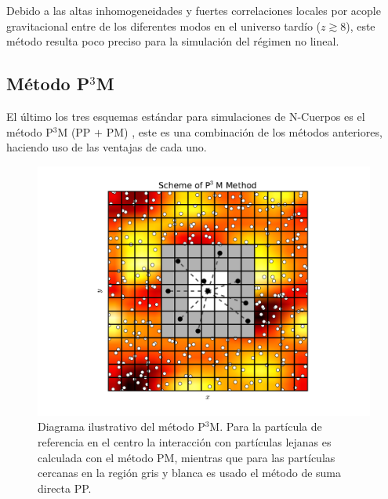 Debido a las altas inhomogeneidades y fuertes correlaciones locales por 
acople gravitacional entre de los diferentes modos en el universo tardío 
($z\gtrsim 8$), este método resulta poco preciso para la simulación del 
régimen no lineal. 


	\subsection{Método P$^3$M}
	\label{subsec:P3Method}
	
	
El último los tres esquemas estándar para simulaciones de N-Cuerpos es el 
método P$^3$M (PP $+$ PM) \cite{hockney1988}, este es una combinación de 
los métodos anteriores, haciendo uso de las ventajas de cada uno.


\begin{figure}[htbp]
	\centering
	\includegraphics[width=1.00\textwidth]
	{./figures/3_nbody_simulations/P3M_Method.pdf}

	\caption{\small{Diagrama ilustrativo del método P$^3$M. Para la 
	partícula de referencia en el centro la interacción con partículas 
	lejanas es calculada con el método PM, mientras que para las 
	partículas cercanas en la región gris y blanca es usado el método de 
	suma directa PP.}}
	
	\label{fig:P3M_Method}
\end{figure}


